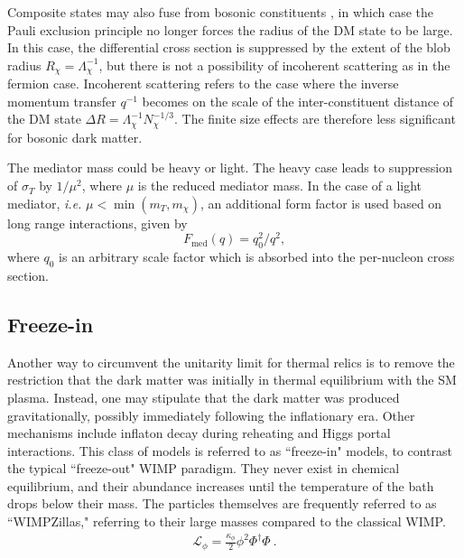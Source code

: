  Composite states may also fuse from bosonic constituents \cite{gresham_astrophysical_2018}, in which case the Pauli exclusion principle no longer forces the radius of the DM state to be large.
 In this case, the differential cross section is suppressed by the extent of the blob radius $R_\chi = \Lambda_\chi^{-1}$, but there is not a possibility of incoherent scattering as in the fermion case.
Incoherent scattering refers to the case where the inverse momentum transfer $q^{-1}$ becomes on the scale of the inter-constituent distance of the DM state $\Delta R = \Lambda_\chi^{-1} N_\chi^{-1/3}$.
The finite size effects are therefore less significant for bosonic dark matter.
 
 The mediator mass could be heavy or light. 
 The heavy case leads to suppression of $\sigma_T$ by $1/\mu^2$, where $\mu$ is the reduced mediator mass.
 In the case of a light mediator, \textit{i.e.} $\mu < \min(m_T, m_\chi)$, an additional form factor is used based on long range interactions\cite{coskuner_direct_2019}, given by 
 \begin{equation}
     F_{\text{med}}(q) = q_0^2 / q^2 ,
 \end{equation}
 \noindent
 where $q_0$ is an arbitrary scale factor which is absorbed into the per-nucleon cross section.
 
 
\subsection{Freeze-in}
\label{sec:freezein}

Another way to circumvent the unitarity limit for thermal relics is to remove the restriction that the dark matter was initially in thermal equilibrium with the SM plasma.
Instead, one may stipulate that the dark matter was produced gravitationally, possibly immediately following the inflationary era\cite{kolb_wimpzillas_1998, kolb_superheavy_2017}.
Other mechanisms include inflaton decay during reheating and Higgs portal interactions\cite{kolb_superheavy_2017}.
This class of models is referred to as ``freeze-in" models, to contrast the typical ``freeze-out" WIMP paradigm. 
They never exist in chemical equilibrium, and their abundance increases until the temperature of the bath drops below their mass.
The particles themselves are frequently referred to as ``WIMPZillas," referring to their large masses compared to the classical WIMP. 
\begin{align}
    \mathcal{L}_{\phi} = \frac{\kappa_\phi}{2} \phi^2 \Phi^\dagger \Phi~.
\end{align}

